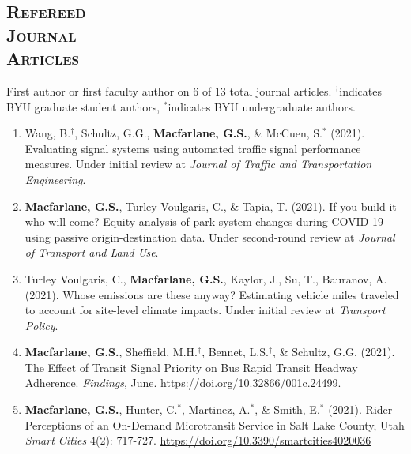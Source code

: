 \documentclass[margin,line]{res}
\newif\ifdetail
\newcounter{enuminitialize}
\newenvironment{myenum}[1][]
{%
 \setcounter{enuminitialize}{#1}
 \addtocounter{enuminitialize}{2}
 \begin{enumerate}[left= 4pt, itemsep=12pt, start=\value{enuminitialize}, label=\arabic*\addtocounter{enumi}{-2}]
}
{%
 \end{enumerate}
}
\newcommand{\secfont}{\scshape }
\begin{document}
\begin{resume}
\section{\secfont Refereed \\ Journal\\ Articles}
First author or first faculty author on 6 of 13 total journal articles.
$^\dagger$indicates BYU graduate student authors, $^*$indicates BYU undergraduate authors.
\ifdetail Paper 1 came from my undergraduate work, papers 2 through 6 were from my doctoral research, and
papers 7 through 13 represent work completed during my time on the faculty at BYU. Number of citations
are from Google Scholar as of December 2021. \fi
\vspace{.3cm}

\begin{myenum}[13]

  \item Wang, B.$^\dagger$, Schultz, G.G., \textbf{Macfarlane, G.S.}, \& McCuen, S.$^*$ (2021). Evaluating signal systems using automated traffic signal performance measures. Under initial review at \textit{Journal of Traffic and Transportation Engineering}.

  \item \textbf{Macfarlane, G.S.}, Turley Voulgaris, C., \& Tapia, T. (2021). If you build it who will come? Equity analysis of park system changes during COVID-19 using passive origin-destination data. Under second-round review at \textit{Journal of Transport and Land Use}.

  \item Turley Voulgaris, C., \textbf{Macfarlane, G.S.}, Kaylor, J., Su, T., Bauranov, A. (2021). Whose emissions are these anyway? Estimating vehicle miles traveled to account for site-level climate impacts. Under initial review at \textit{Transport Policy}.

  \item \textbf{Macfarlane, G.S.}, Sheffield, M.H.$^\dagger$, Bennet, L.S.$^\dagger$, \& Schultz, G.G. (2021).
  The Effect of Transit Signal Priority on Bus Rapid Transit Headway Adherence. \textit{Findings}, June. \url{https://doi.org/10.32866/001c.24499}.

  \item\textbf{Macfarlane, G.S.}, Hunter, C.$^*$, Martinez, A.$^*$, \& Smith, E.$^*$  (2021). Rider
Perceptions of an On-Demand Microtransit Service in Salt Lake County, Utah
\textit{ Smart Cities} 4(2): 717-727. \url{https://doi.org/10.3390/smartcities4020036} \ifdetail Citations: 1 \fi


\end{myenum}
\end{resume}
\end{document}
